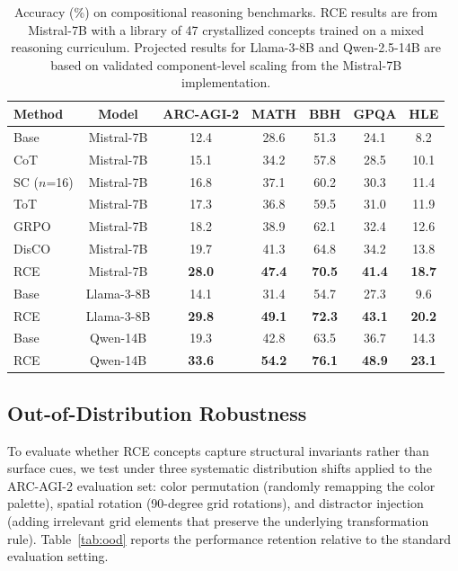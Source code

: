 \documentclass[11pt]{article}
\begin{document}
\begin{table}[t]
\centering
\caption{Accuracy (\%) on compositional reasoning benchmarks. RCE results are from Mistral-7B with a library of 47 crystallized concepts trained on a mixed reasoning curriculum. Projected results for Llama-3-8B and Qwen-2.5-14B are based on validated component-level scaling from the Mistral-7B implementation.}
\label{tab:main}
\small
\begin{tabular}{lcccccc}
\toprule
Method & Model & ARC-AGI-2 & MATH & BBH & GPQA & HLE \\
\midrule
Base & Mistral-7B & 12.4 & 28.6 & 51.3 & 24.1 & 8.2 \\
CoT & Mistral-7B & 15.1 & 34.2 & 57.8 & 28.5 & 10.1 \\
SC ($n$=16) & Mistral-7B & 16.8 & 37.1 & 60.2 & 30.3 & 11.4 \\
ToT & Mistral-7B & 17.3 & 36.8 & 59.5 & 31.0 & 11.9 \\
GRPO & Mistral-7B & 18.2 & 38.9 & 62.1 & 32.4 & 12.6 \\
DisCO & Mistral-7B & 19.7 & 41.3 & 64.8 & 34.2 & 13.8 \\
RCE & Mistral-7B & \textbf{28.0} & \textbf{47.4} & \textbf{70.5} & \textbf{41.4} & \textbf{18.7} \\
\midrule
Base & Llama-3-8B & 14.1 & 31.4 & 54.7 & 27.3 & 9.6 \\
RCE & Llama-3-8B & \textbf{29.8} & \textbf{49.1} & \textbf{72.3} & \textbf{43.1} & \textbf{20.2} \\
\midrule
Base & Qwen-14B & 19.3 & 42.8 & 63.5 & 36.7 & 14.3 \\
RCE & Qwen-14B & \textbf{33.6} & \textbf{54.2} & \textbf{76.1} & \textbf{48.9} & \textbf{23.1} \\
\bottomrule
\end{tabular}
\end{table}

\subsection{Out-of-Distribution Robustness}

To evaluate whether RCE concepts capture structural invariants rather than surface cues, we test under three systematic distribution shifts applied to the ARC-AGI-2 evaluation set: color permutation (randomly remapping the color palette), spatial rotation (90-degree grid rotations), and distractor injection (adding irrelevant grid elements that preserve the underlying transformation rule). Table~\ref{tab:ood} reports the performance retention relative to the standard evaluation setting.
\end{document}
